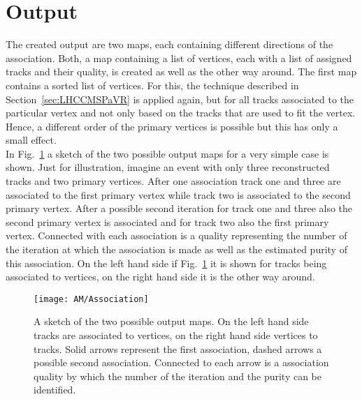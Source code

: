 \section{Output\label{sec:AMOutput}}

The created output are two maps, each containing different directions of the association. Both, a map containing a list of vertices, each with a list of assigned tracks and their quality, is created as well as the other way around. The first map contains a sorted list of vertices. For this, the technique described in Section~\ref{sec:LHCCMSPaVR} is applied again, but for all tracks associated to the particular vertex and not only based on the tracks that are used to fit the vertex. Hence, a different order of the primary vertices is possible but this has only a small effect.\\
In Fig.~\ref{plot:AMOutput} a sketch of the two possible output maps for a very simple case is shown. Just for illustration, imagine an event with only three reconstructed tracks and two primary vertices. After one association track one and three are associated to the first primary vertex while track two is associated to the second primary vertex. After a possible second iteration for track one and three also the second primary vertex is associated and for track two also the first primary vertex. Connected with each association is a quality representing the number of the iteration at which the association is made as well as the estimated purity of this association. On the left hand side if Fig.~\ref{plot:AMOutput} it is shown for tracks being associated to vertices, on the right hand side it is the other way around.

\begin{figure}[Htb]
    \centering
    \texttt{[image: AM/Association]}
    \caption[Sketch of the two different output maps]{A sketch of the two possible output maps. On the left hand side tracks are associated to vertices, on the right hand side vertices to tracks. Solid arrows represent the first association, dashed arrows a possible second association. Connected to each arrow is a association quality by which the number of the iteration and the purity can be identified. \label{plot:AMOutput}}
\end{figure}
